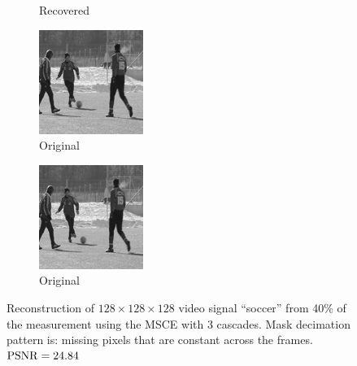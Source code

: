\begin{figure}
\begin{subfigure}{0.4\textwidth}
    \caption{Recovered}
  \end{subfigure}
  \begin{subfigure}{0.4\textwidth}
    \centering
    \includegraphics[width=.9\textwidth]{Chapter7/Images/soccer40_orig_11.png}
    \caption{Original}
  \end{subfigure}
  \begin{subfigure}{0.4\textwidth}
    \centering
    \includegraphics[width=.9\textwidth]{Chapter7/Images/soccer40_orig_12.png}
    \caption{Original}
  \end{subfigure}
  \caption{Reconstruction of $128\times 128\times 128$ video signal ``soccer'' from 40\% of the measurement using the MSCE with 3 cascades. Mask decimation pattern is: missing pixels that are constant across the frames. $\operatorname*{PSNR} = 24.84$}
\end{figure}




